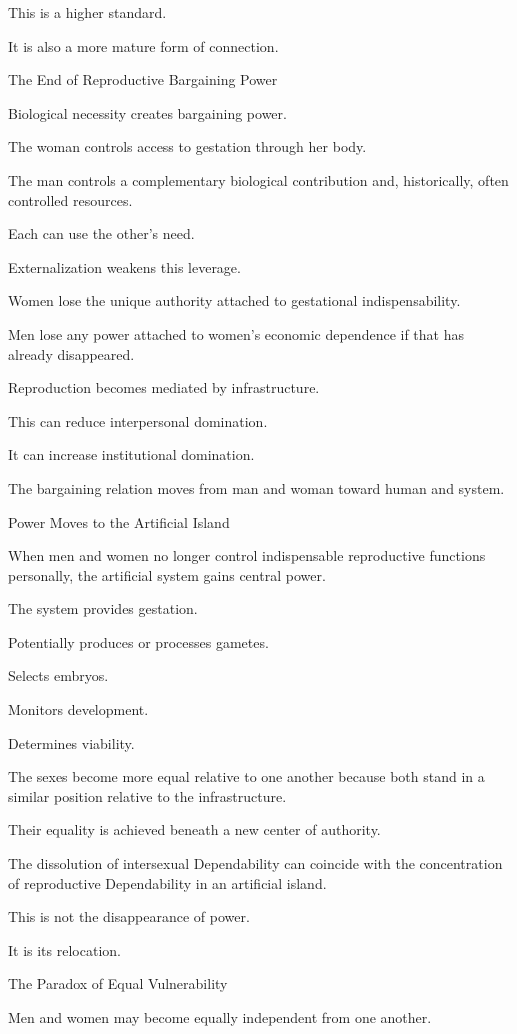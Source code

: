 This is a higher standard.

It is also a more mature form of connection.

The End of Reproductive Bargaining Power

Biological necessity creates bargaining power.

The woman controls access to gestation through her body.

The man controls a complementary biological contribution and, historically, often controlled resources.

Each can use the other’s need.

Externalization weakens this leverage.

Women lose the unique authority attached to gestational indispensability.

Men lose any power attached to women’s economic dependence if that has already disappeared.

Reproduction becomes mediated by infrastructure.

This can reduce interpersonal domination.

It can increase institutional domination.

The bargaining relation moves from man and woman toward human and system.

Power Moves to the Artificial Island

When men and women no longer control indispensable reproductive functions personally, the artificial system gains central power.

The system provides gestation.

Potentially produces or processes gametes.

Selects embryos.

Monitors development.

Determines viability.

The sexes become more equal relative to one another because both stand in a similar position relative to the infrastructure.

Their equality is achieved beneath a new center of authority.

The dissolution of intersexual Dependability can coincide with the concentration of reproductive Dependability in an artificial island.

This is not the disappearance of power.

It is its relocation.

The Paradox of Equal Vulnerability

Men and women may become equally independent from one another.

